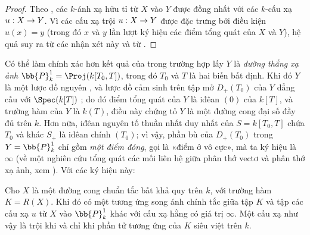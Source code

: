 \documentclass[oneside,10pt]{amsart}
\makeatletter
\newcommand{\ega@arrow}[2]{\mathchoice{#1}{#2}{#2}{#2}}
\renewcommand{\to}{\ega@arrow{\longrightarrow}{\rightarrow}}
\let\EGAOriginalLabel\label
\renewcommand{\label}[1]{\phantomsection\EGAOriginalLabel{#1}}
\makeatother
\begin{document}
\begin{proof}
Theo , các $k$-ánh xạ hữu tỉ từ $X$ vào $Y$ được đồng nhất với các $k$-cấu xạ $u:X\to Y$.
Vì các cấu xạ trội $u:X\to Y$ được đặc trưng bởi điều kiện $u(x)=y$ (trong đó $x$ và $y$ lần lượt ký hiệu các điểm tổng quát của $X$ và $Y$), hệ quả suy ra từ các nhận xét này và từ .
\end{proof}

\begin{env}[7.4.14]
\label{II.7.4.14}
Có thể làm chính xác hơn kết quả của  trong trường hợp lấy $Y$ là \emph{đường thẳng xạ ảnh} $\bb{P}_k^1=\Proj(k[T_0,T])$, trong đó $T_0$ và $T$ là hai biến bất định.
Khi đó $Y$ là một lược đồ nguyên , và lược đồ cảm sinh trên tập mở $D_+(T_0)$ của $Y$ đẳng cấu với $\Spec(k[T])$ ; do đó điểm tổng quát của $Y$ là iđêan $(0)$ của $k[T]$, và trường hàm của $Y$ là $k(T)$, điều này chứng tỏ $Y$ là một đường cong đại số đầy đủ trên $k$.
Hơn nữa, iđêan nguyên tố thuần nhất duy nhất của $S=k[T_0,T]$ chứa $T_0$ và khác $S_+$ là iđêan chính $(T_0)$; vì vậy, phần bù của $D_+(T_0)$ trong $Y=\bb{P}_k^1$ chỉ gồm \emph{một điểm đóng}, gọi là «điểm ở vô cực», mà ta ký hiệu là $\infty$ (về một nghiên cứu tổng quát các mối liên hệ giữa phân thớ vectơ và phân thớ xạ ảnh, xem ).
Với các ký hiệu này:
\end{env}

\begin{corollary}[7.4.15]
\label{II.7.4.15}
Cho $X$ là một đường cong chuẩn tắc bất khả quy trên $k$, với trường hàm $K=R(X)$.
Khi đó có một tương ứng song ánh chính tắc giữa tập $K$ và tập các cấu xạ $u$ từ $X$ vào $\bb{P}_k^1$ khác với cấu xạ hằng có giá trị $\infty$.
Một cấu xạ như vậy là trội khi và chỉ khi phần tử tương ứng của $K$ siêu việt trên $k$.
\end{corollary}
\end{document}
